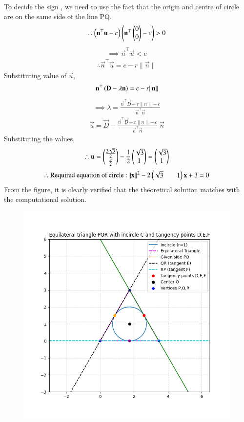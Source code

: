 \documentclass[journal]{IEEEtran}
\begin{document}
\newpage
\vspace*{0.25cm}
To decide the sign , we need to use the fact that the origin and centre of circle are on the same side of the line PQ.
\begin{align}
    \therefore \left(\mathbf{n}^{\top}\mathbf{u}-c\right)\left(\mathbf{n}^{\top}\begin{pmatrix}0\\0\end{pmatrix}-c\right)>0
\end{align}
\begin{align}
    \implies \vec{n}^{\top}\vec{u}<c
\end{align}
\begin{align}
    \therefore \vec{n}^{\top}\vec{u}=c-r\|\vec{n}\|
\end{align}
Substituting value of $\vec{u}$,
\begin{align}
\mathbf{n}^{\top}\left(\mathbf{D}-\lambda\mathbf{n}\right)=c-r\|\mathbf{n}\|
\end{align}
\begin{align}
    \implies \lambda=\frac{\vec{n}^{\top}\vec{D}+r\|n\|-c}{\vec{n}^{\top}\vec{n}}
\end{align}
\begin{align}
    \vec{u}=\vec{D}-\frac{\vec{n}^{\top}\vec{D}+r\|n\|-c}{\vec{n}^{\top}\vec{n}}\;\vec{n}
\end{align}
Substituting the values,
\begin{align}
    \therefore \mathbf{u}=\begin{pmatrix}\frac{3\sqrt{3}}{2}\\\frac{3}{2}\end{pmatrix}
-\frac{1}{2}\begin{pmatrix}\sqrt{3}\\1\end{pmatrix}=\begin{pmatrix}\sqrt{3}\\1\end{pmatrix}
\end{align}
\begin{align}
    \therefore \text{Required equation of circle :\,}\|\mathbf{x}\|^2-2\begin{pmatrix}\sqrt{3}&&1\end{pmatrix}\mathbf{x}+3=0
\end{align}
From the figure, it is clearly verified that the theoretical solution matches with the computational solution.\\
\begin{figure}[H]
    \centering
    \includegraphics[width=0.4\columnwidth]{figs/Figure_1.png}
    \label{fig:1}
\end{figure}
\end{document}
